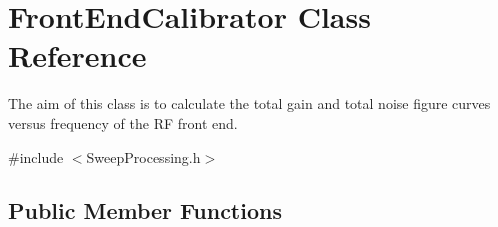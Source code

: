 \hypertarget{classFrontEndCalibrator}{}\section{Front\+End\+Calibrator Class Reference}
\label{classFrontEndCalibrator}


The aim of this class is to calculate the total gain and total noise figure curves versus frequency of the RF front end.  




{\ttfamily \#include $<$Sweep\+Processing.\+h$>$}

\subsection*{Public Member Functions}

